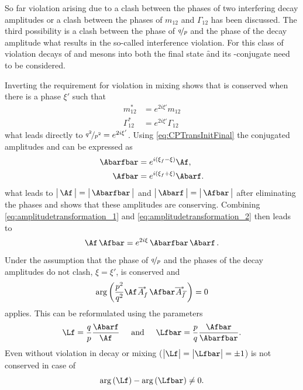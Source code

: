 So far \CP violation arising due to a clash between the phases of two interfering decay amplitudes or a clash between the phases of $m_{12}$ and $\Gamma_{12}$ has been discussed.
The third possibility is a clash between the phase of $\nicefrac{q}{p}$ and the phase of the decay amplitude what results in the so-called interference \CP violation.
For this class of \CP violation decays of \Bz and \Bzb mesons into both the final state \f and its \CP-conjugate \fbar need to be considered.

Inverting the requirement for \CP violation in mixing shows that \CP is conserved when there is a phase $\xi'$ such that
\begin{equation}
\begin{split}
m_{12}^\ast &= e^{2i\xi'}m_{12}\\
\Gamma_{12}^\ast &= e^{2i\xi'}\Gamma_{12}\label{eq:CPconservationMixing}
\end{split}
\end{equation}
what leads directly to $\nicefrac{q^2}{p^2} = e^{2i\xi'}$.
Using \cref{eq:CPTransInitFinal} the \CP conjugated amplitudes \Abarfbar and \Afbar can be expressed as
\begin{align}
\Abarfbar&=e^{i\left(\xi_f-\xi\right)}\Af,\label{eq:amplitudetransformation_1}\\
\Afbar&=e^{i\left(\xi_f+\xi\right)}\Abarf.\label{eq:amplitudetransformation_2}
\end{align}
what leads to $\big|\,\Af\,\big|=\big|\,\Abarfbar\,\big|$ and $\big|\,\Abarf\,\big|=\big|\,\Afbar\,\big|$ after eliminating the phases and shows that these amplitudes are \CP conserving.
Combining \cref{eq:amplitudetransformation_1} and \cref{eq:amplitudetransformation_2} then leads to
\begin{equation}
\Af\,\Afbar=e^{2i\xi}\,\Abarfbar\,\Abarf\,.
\end{equation}
Under the assumption that the phase of $\nicefrac{q}{p}$ and the phases of the decay amplitudes do not clash, \ie $\xi=\xi'$, \CP is conserved and
\begin{equation}
\arg\left(\frac{p^2}{q^2}\Af \,\overline{\kern -1.0pt A\kern -1.0pt}_{\kern 1.0pt f}^\ast\,\Afbar\overline{\kern -1.0pt \,A\kern -1.0pt}_{\kern 2.5pt\overline{\kern -1.5pt f\kern 1.5pt}}^\ast\right)=0
\end{equation}
applies.
This can be reformulated using the parameters
\begin{equation}
\Lf=\frac{q}{p}\frac{\Abarf}{\Af}\hspace{0.5cm}\text{and}
\hspace{0.5cm}\Lfbar=\frac{p}{q}\frac{\Afbar}{\Abarfbar}.
\end{equation}
Even without \CP violation in decay or mixing ($\big|\Lf\big|=\big|\Lfbar\big| = \pm1$) \CP is not conserved in case of
\begin{equation}
	\arg\left(\Lf\right)-\arg\left(\Lfbar\right)\neq0. \label{eq:conditionCPV}
\end{equation}

